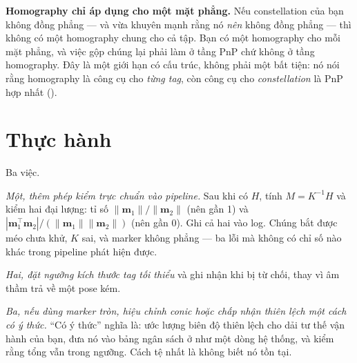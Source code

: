 \documentclass[../../marker.tex]{subfiles}
\begin{document}
\textbf{Homography chỉ áp dụng cho một mặt phẳng.} Nếu constellation của bạn không đồng phẳng --- và  vừa khuyên mạnh rằng nó \emph{nên} không đồng phẳng --- thì không có một homography chung cho cả tập. Bạn có một homography cho mỗi mặt phẳng, và việc gộp chúng lại phải làm ở tầng PnP chứ không ở tầng homography. Đây là một giới hạn có cấu trúc, không phải một bất tiện: nó nói rằng homography là công cụ cho \emph{từng tag}, còn công cụ cho \emph{constellation} là PnP hợp nhất ().

\section{Thực hành}

Ba việc.

\emph{Một, thêm phép kiểm trực chuẩn vào pipeline.} Sau khi có \(H\), tính \(M = K^{-1}H\) và kiểm hai đại lượng: tỉ số \(\|\mathbf{m}_1\|/\|\mathbf{m}_2\|\) (nên gần 1) và \(|\mathbf{m}_1^\top\mathbf{m}_2|/(\|\mathbf{m}_1\|\|\mathbf{m}_2\|)\) (nên gần 0). Ghi cả hai vào log. Chúng bắt được méo chưa khử, \(K\) sai, và marker không phẳng --- ba lỗi mà không có chỉ số nào khác trong pipeline phát hiện được.

\emph{Hai, đặt ngưỡng kích thước tag tối thiểu} và ghi nhận khi bị từ chối, thay vì âm thầm trả về một pose kém.

\emph{Ba, nếu dùng marker tròn, hiệu chỉnh conic hoặc chấp nhận thiên lệch một cách có ý thức.} ``Có ý thức'' nghĩa là: ước lượng biên độ thiên lệch cho dải tư thế vận hành của bạn, đưa nó vào bảng ngân sách ở  như một dòng hệ thống, và kiểm rằng tổng vẫn trong ngưỡng. Cách tệ nhất là không biết nó tồn tại.
\end{document}
